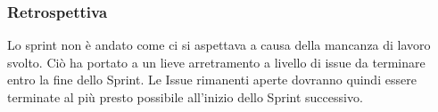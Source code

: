 \subsubsection{Retrospettiva}
Lo sprint non è andato come ci si aspettava a causa della mancanza di lavoro svolto.
Ciò ha portato a un lieve arretramento a livello di issue da terminare entro la fine dello Sprint. 
Le Issue rimanenti aperte dovranno quindi essere terminate al più presto possibile all'inizio dello Sprint successivo.